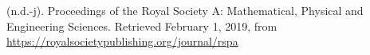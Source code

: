 \documentclass[12pt,twoside]{article}
\begin{document}
{\begin{thebibliography}{222}
\mdbibitemlabel{[n.d.-j]}(n.d.-j). Proceedings of the Royal Society A: Mathematical, Physical and Engineering Sciences. Retrieved February 1, 2019, from \href{https://royalsocietypublishing.org/journal/rspa}{{\ttfamily https://\hspace{0pt}royalsocietypublishing.\hspace{0pt}org/\hspace{0pt}journal/\hspace{0pt}rspa}}\label{royalsociety_proceedings_nodate}%
\par%
\end{thebibliography}}%
\end{document}
